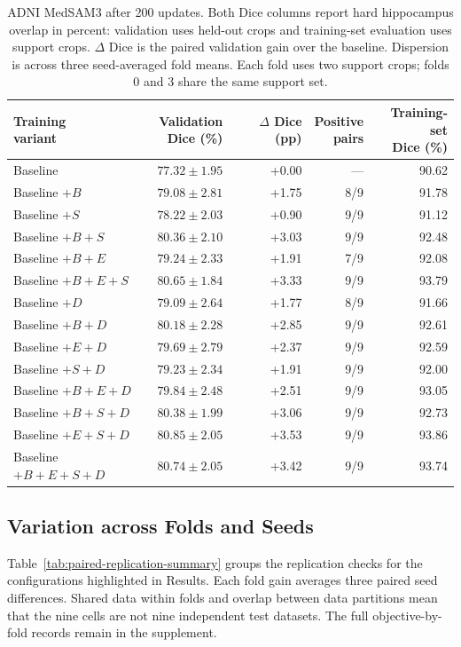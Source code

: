 \documentclass[12pt,a4paper]{article}
\begin{document}
\begin{table}[htbp]
\centering\small{}
\setlength{\tabcolsep}{5pt}
\renewcommand{\arraystretch}{1.15}
\begin{tabular}{@{}lrrrr@{}}
\hline
\shortstack{Training\\variant} & \shortstack{Validation\\Dice (\%)} & \shortstack{$\Delta$ Dice\\(pp)} & \shortstack{Positive\\pairs} & \shortstack{Training-set\\Dice (\%)} \\
\hline
Baseline & $77.32\pm1.95$ & +0.00 & --- & 90.62 \\
Baseline $+B$ & $79.08\pm2.81$ & +1.75 & 8/9 & 91.78 \\
Baseline $+S$ & $78.22\pm2.03$ & +0.90 & 9/9 & 91.12 \\
Baseline $+B+S$ & $80.36\pm2.10$ & +3.03 & 9/9 & 92.48 \\
Baseline $+B+E$ & $79.24\pm2.33$ & +1.91 & 7/9 & 92.08 \\
Baseline $+B+E+S$ & $80.65\pm1.84$ & +3.33 & 9/9 & 93.79 \\
Baseline $+D$ & $79.09\pm2.64$ & +1.77 & 8/9 & 91.66 \\
Baseline $+B+D$ & $80.18\pm2.28$ & +2.85 & 9/9 & 92.61 \\
Baseline $+E+D$ & $79.69\pm2.79$ & +2.37 & 9/9 & 92.59 \\
Baseline $+S+D$ & $79.23\pm2.34$ & +1.91 & 9/9 & 92.00 \\
Baseline $+B+E+D$ & $79.84\pm2.48$ & +2.51 & 9/9 & 93.05 \\
Baseline $+B+S+D$ & $80.38\pm1.99$ & +3.06 & 9/9 & 92.73 \\
Baseline $+E+S+D$ & $80.85\pm2.05$ & +3.53 & 9/9 & 93.86 \\
Baseline $+B+E+S+D$ & $80.74\pm2.05$ & +3.42 & 9/9 & 93.74 \\
\hline
\end{tabular}
\caption{ADNI MedSAM3 after 200 updates. Both Dice columns report hard
hippocampus overlap in percent: validation uses held-out crops and
training-set evaluation uses support crops. $\Delta$ Dice is the paired
validation gain over the baseline. Dispersion is across three
seed-averaged fold means. Each fold uses two support crops; folds 0 and 3
share the same support set.}
\label{tab:medsam-adni-noaug}
\end{table}

\subsection{Variation across Folds and Seeds}
Table~\ref{tab:paired-replication-summary} groups the replication checks
for the configurations highlighted in Results. Each fold gain averages
three paired seed differences. Shared data within folds and overlap
between data partitions mean that the nine cells are not nine independent
test datasets. The full objective-by-fold records remain in the supplement.
\end{document}
